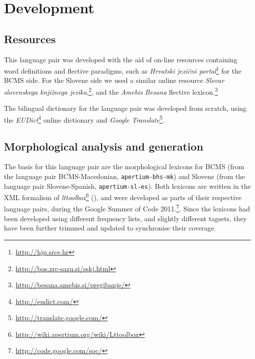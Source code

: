 \section{Development}

\subsection{Resources}
This language pair was developed with the
aid of on-line resources containing word definitions and flective
paradigms, such as \emph{Hrvatski jezični
  portal}\footnote{\url{http://hjp.srce.hr}} for the BCMS side. For
the Slovene side we used a similar online resource \emph{Slovar
  slovenskega knjižnega
  jezika},\footnote{\url{http://bos.zrc-sazu.si/sskj.html}}, and the
\emph{Amebis Besana} flective
lexicon.\footnote{\url{http://besana.amebis.si/pregibanje/}}

The bilingual dictionary for the language pair was developed from scratch,
using the \emph{EUDict}\footnote{\url{http://eudict.com/}} online
dictionary and \emph{Google
  Translate}\footnote{\url{http://translate.google.com/}}.

\subsection{Morphological analysis and generation}
The basis for this language pair are the morphological
lexicons for BCMS (from
the language pair BCMS-Macedonian, {\small{\tt apertium-bhs-mk}}) and Slovene (from the
language pair Slovene-Spanish, {\small{\tt apertium-sl-es}}). Both
lexicons are written in the XML formalism of
\emph{lttoolbox}\footnote{\url{http://wiki.apertium.org/wiki/Lttoolbox}}
(\citealp{rojas2005construccion}), and were developed as parts of
their respective language pairs, during the Google Summer of Code
2011.\footnote{\url{http://code.google.com/soc/}}. Since the lexicons
had been developed using different frequency lists, and slightly
different tagsets, they have been further trimmed and updated to
synchronise their coverage.









